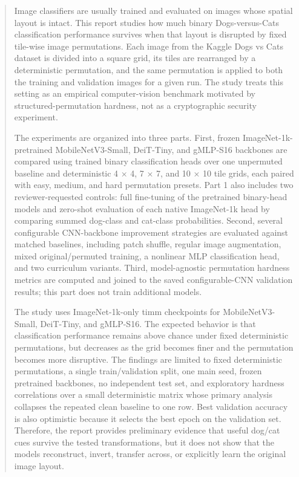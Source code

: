 \documentclass[12pt]{article}
\begin{document}
\begin{flushleft}
\begin{abstract}
\noindent Image classifiers are usually trained and evaluated on images whose spatial layout is intact. This report studies how much binary Dogs-versus-Cats classification performance survives when that layout is disrupted by fixed tile-wise image permutations. Each image from the Kaggle Dogs vs Cats dataset is divided into a square grid, its tiles are rearranged by a deterministic permutation, and the same permutation is applied to both the training and validation images for a given run. The study treats this setting as an empirical computer-vision benchmark motivated by structured-permutation hardness, not as a cryptographic security experiment.

\par\smallskip\noindent The experiments are organized into three parts. First, frozen ImageNet-1k-pretrained MobileNetV3-Small, DeiT-Tiny, and gMLP-S16 backbones are compared using trained binary classification heads over one unpermuted baseline and deterministic 4 × 4, 7 × 7, and 10 × 10 tile grids, each paired with easy, medium, and hard permutation presets. Part 1 also includes two reviewer-requested controls: full fine-tuning of the pretrained binary-head models and zero-shot evaluation of each native ImageNet-1k head by comparing summed dog-class and cat-class probabilities. Second, several configurable CNN-backbone improvement strategies are evaluated against matched baselines, including patch shuffle, regular image augmentation, mixed original/permuted training, a nonlinear MLP classification head, and two curriculum variants. Third, model-agnostic permutation hardness metrics are computed and joined to the saved configurable-CNN validation results; this part does not train additional models.

\par\smallskip\noindent The study uses ImageNet-1k-only timm checkpoints for MobileNetV3-Small, DeiT-Tiny, and gMLP-S16. The expected behavior is that classification performance remains above chance under fixed deterministic permutations, but decreases as the grid becomes finer and the permutation becomes more disruptive. The findings are limited to fixed deterministic permutations, a single train/validation split, one main seed, frozen pretrained backbones, no independent test set, and exploratory hardness correlations over a small deterministic matrix whose primary analysis collapses the repeated clean baseline to one row. Best validation accuracy is also optimistic because it selects the best epoch on the validation set. Therefore, the report provides preliminary evidence that useful dog/cat cues survive the tested transformations, but it does not show that the models reconstruct, invert, transfer across, or explicitly learn the original image layout.
\end{abstract}
\end{flushleft}
\end{document}
